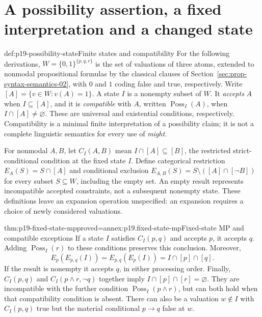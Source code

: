 \section{A possibility assertion, a fixed interpretation and a changed state}
\label{sec:p19-might-and-fixed-context}

\begin{hbdefinition}{def:p19-possibility-state}{Finite states and compatibility}
For the following derivations, \(W=\{0,1\}^{\{p,q,r\}}\) is the set of
valuations of three atoms, extended to nonmodal propositional formulas by
the classical clauses of Section~\ref{sec:prop-syntax-semantics-02},
with \(0\) and \(1\) coding false and true, respectively. Write
\([A]=\{v\in W:v(A)=1\}\). A state \(I\) is a nonempty subset of \(W\).
It \emph{accepts} \(A\) when \(I\subseteq[A]\), and it is
\emph{compatible} with \(A\), written \(\operatorname{Poss}_I(A)\), when
\(I\cap[A]\ne\varnothing\). These are universal and existential conditions,
respectively. Compatibility is a minimal finite interpretation of a
possibility claim; it is not a complete linguistic semantics for every use
of \emph{might}.

For nonmodal \(A,B\), let \(C_I(A,B)\) mean
\(I\cap[A]\subseteq[B]\), the restricted strict-conditional condition at
the fixed state \(I\). Define categorical restriction
\(E_A(S)=S\cap[A]\) and conditional exclusion
\(E_{A,B}(S)=S\setminus([A]\cap[\neg B])\) for every subset
\(S\subseteq W\), including the empty set.
An empty result represents incompatible accepted constraints, not a
subsequent nonempty state. These definitions leave an expansion operation
unspecified: an expansion requires a choice of newly considered valuations.
\end{hbdefinition}

\begin{hblemma}{thm:p19-fixed-state-mp}{proved=annex:p19.fixed-state-mp}{Fixed-state MP and compatible exceptions}
If a state \(I\) satisfies \(C_I(p,q)\) and accepts \(p\), it accepts \(q\).
Adding \(\operatorname{Poss}_I(r)\) to these conditions preserves this
conclusion. Moreover,
\[
 E_p(E_{p,q}(I))=E_{p,q}(E_p(I))=I\cap[p]\cap[q].
\]
If the result is nonempty it accepts \(q\), in either processing order.
Finally, \(C_I(p,q)\) and \(C_I(p\land r,\neg q)\) together imply
\(I\cap[p]\cap[r]=\varnothing\). They are incompatible with the further
condition \(\operatorname{Poss}_I(p\land r)\), but can both hold when that
compatibility condition is absent.
There can also be a valuation \(w\notin I\) with \(C_I(p,q)\) true
but the material conditional \(p\to q\) false at \(w\).
\end{hblemma}

